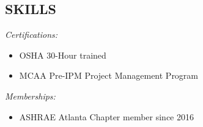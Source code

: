 \documentclass[margin]{res}
\begin{document}
\begin{resume}
\section{SKILLS} {\sl Certifications:} 
        \begin{itemize}  \itemsep -2pt %
	\item OSHA 30-Hour trained
	\item MCAA Pre-IPM Project Management Program
	\end{itemize}
  {\sl Memberships:}
          \begin{itemize}  \itemsep -2pt %
	\item ASHRAE Atlanta Chapter member since 2016
	\end{itemize}
 



\end{resume}
\end{document}
